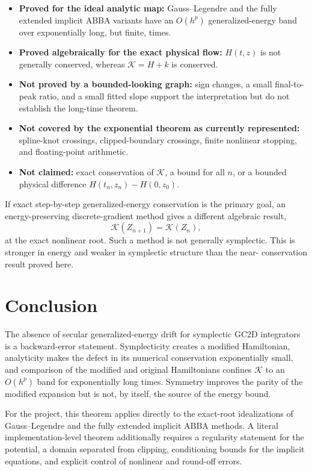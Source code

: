 \documentclass[11pt,a4paper]{article}
\theoremstyle{definition}
\theoremstyle{remark}
\newcommand{\K}{\mathcal{K}}
\begin{document}
\begin{itemize}
 \item \textbf{Proved for the ideal analytic map:} Gauss--Legendre and the
       fully extended implicit ABBA variants have an $O(h^p)$ generalized-energy
       band over exponentially long, but finite, times.
 \item \textbf{Proved algebraically for the exact physical flow:}
       $H(t,z)$ is not generally conserved, whereas $\K=H+k$ is conserved.
 \item \textbf{Not proved by a bounded-looking graph:} sign changes, a small
       final-to-peak ratio, and a small fitted slope support the interpretation
       but do not establish the long-time theorem.
 \item \textbf{Not covered by the exponential theorem as currently represented:}
       spline-knot crossings, clipped-boundary crossings, finite nonlinear
       stopping, and floating-point arithmetic.
 \item \textbf{Not claimed:} exact conservation of $\K$, a bound for all
       $n$, or a bounded physical difference $H(t_n,z_n)-H(0,z_0)$.
\end{itemize}

If exact step-by-step generalized-energy conservation is the primary goal, an
energy-preserving discrete-gradient method gives a different algebraic result,
\begin{equation}
 \K(Z_{n+1})=\K(Z_n),
 \label{eq:discrete-gradient-contrast}
\end{equation}
at the exact nonlinear root.  Such a method is not generally symplectic.  This
is stronger in energy and weaker in symplectic structure than the near-
conservation result proved here.

\section{Conclusion}

The absence of secular generalized-energy drift for symplectic GC2D
integrators is a backward-error statement.  Symplecticity creates a modified
Hamiltonian, analyticity makes the defect in its numerical conservation
exponentially small, and comparison of the modified and original Hamiltonians
confines $\K$ to an $O(h^p)$ band for exponentially long times.  Symmetry
improves the parity of the modified expansion but is not, by itself, the
source of the energy bound.

For the project, this theorem applies directly to the exact-root idealizations
of Gauss--Legendre and the fully extended implicit ABBA methods.  A literal
implementation-level theorem additionally requires a regularity statement for
the potential, a domain separated from clipping, conditioning bounds for the
implicit equations, and explicit control of nonlinear and round-off errors.
\end{document}
